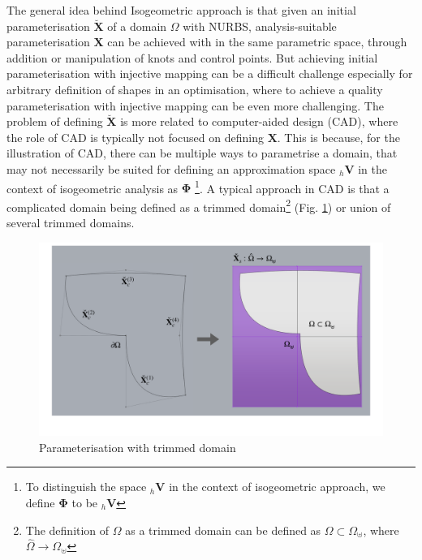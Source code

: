 The general idea behind Isogeometric approach is that given an initial parameterisation $\breve{\bm X}$ of a domain $\Omega$ with NURBS, analysis-suitable parameterisation $\bm X$ can be achieved with in the same parametric space, through addition or manipulation of knots and control points. But achieving initial parameterisation with injective mapping can be a difficult challenge especially for arbitrary definition of shapes in an optimisation, where to achieve a quality parameterisation with injective mapping can be even more challenging. The problem of defining $\breve{\bm X}$ is more related to computer-aided design (CAD), where the role of CAD is typically not focused on defining $\bm X$. This is because, for the illustration of CAD, there can be multiple ways to parametrise a domain, that may not necessarily be suited for defining an approximation space ${}_h \bm V$ in the context of isogeometric analysis as $\bm \Phi$ \footnote{To distinguish the space ${}_h \bm V$ in the context of isogeometric approach, we define $\bm \Phi$ to be ${}_h \bm V$}. A typical approach in CAD is that a complicated domain being defined as a trimmed domain\footnote{The definition of $\Omega$ as a trimmed domain can be defined as $\Omega \subset \Omega_{\uplus}$, where $\hat{\Omega}\rightarrow\Omega_{\uplus}$ } (Fig. \ref{fig:trimmed_dom}) or union of several trimmed domains. 

\begin{figure}[h!]
    \centering
    \includegraphics[scale=0.25]{Chapter5/Pictures/trimmed_dom}
    \caption{Parameterisation with trimmed domain }
    \label{fig:trimmed_dom}
\end{figure}


